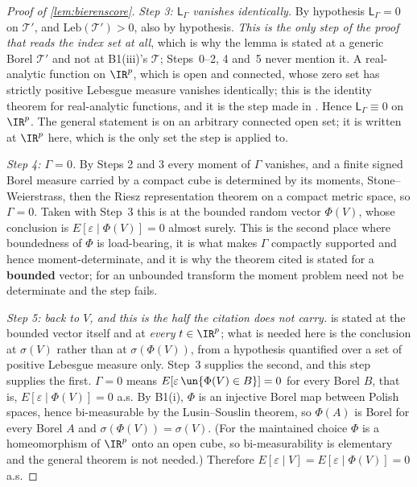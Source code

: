 \begin{proof}[Proof of \cref{lem:bierenscore}]
\emph{Step 3: $\mathsf L_\Gamma$ vanishes identically.}
By hypothesis $\mathsf L_\Gamma=0$ on $\mathcal T'$, and $\mathrm{Leb}(\mathcal T')>0$, also by
hypothesis. \emph{This is the only step of the proof that reads the index set at all}, which is why the
lemma is stated at a generic Borel $\mathcal T'$ and not at B1(iii)'s $\mathcal T$; Steps~0--2, 4 and~5
never mention it. A
real-analytic function on $\IR^{p}$, which is open and connected, whose zero set has strictly
positive Lebesgue measure vanishes identically; this is the identity theorem for real-analytic
functions, and it is the step made in \citet[proof of Thm.~1]{bierens1990}. Hence
$\mathsf L_\Gamma\equiv0$ on $\IR^{p}$. The general statement is on an arbitrary connected open
set; it is written at $\IR^{p}$ here, which is the only set the step is applied to.

\emph{Step 4: $\Gamma=0$.} By Steps 2 and 3 every moment of $\Gamma$ vanishes, and a finite signed Borel
measure carried by a compact cube is determined by its moments, Stone--Weierstrass, then the Riesz
representation theorem on a compact metric space, so $\Gamma=0$. Taken with Step~3 this is
\citet[Thm.~1]{bierens1990} at the bounded random vector $\Phi(V)$, whose conclusion is
$E[\varepsilon\mid\Phi(V)]=0$ almost surely. This is the second place where boundedness of $\Phi$ is
load-bearing, it is what makes $\Gamma$ compactly supported and hence moment-determinate, and it is why
the theorem cited is stated for a \textbf{bounded} vector; for an unbounded transform the moment problem
need not be determinate and the step fails.

\emph{Step 5: back to $V$, and this is the half the citation does not carry.} \citet[Thm.~1]{bierens1990}
is stated at the bounded vector itself and at \emph{every} $t\in\IR^{p}$; what is needed here is the
conclusion at $\sigma(V)$ rather than at $\sigma(\Phi(V))$, from a hypothesis quantified over a set of
positive Lebesgue measure only. Step~3 supplies the second, and this step supplies the first.
$\Gamma=0$ means $E[\varepsilon\,\un\{\Phi(V)\in B\}]=0$ for every Borel $B$, that is,
$E[\varepsilon\mid\Phi(V)]=0$ a.s. By B1(i), $\Phi$ is an injective Borel map between Polish spaces,
hence bi-measurable by the Lusin--Souslin theorem, so $\Phi(A)$ is Borel for every Borel $A$ and
$\sigma(\Phi(V))=\sigma(V)$. (For the maintained choice $\Phi$ is a homeomorphism of $\IR^{p}$ onto an
open cube, so bi-measurability is elementary and the general theorem is not needed.) Therefore
$E[\varepsilon\mid V]=E[\varepsilon\mid\Phi(V)]=0$ a.s.
\end{proof}

